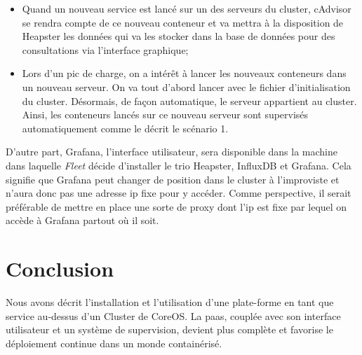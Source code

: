 \begin{onehalfspace}
\begin{itemize}
	\item Quand un nouveau service est lancé sur un des serveurs du cluster, cAdvisor se rendra compte de ce nouveau conteneur et va mettra à la disposition de Heapster les données qui va les stocker dans la base de données pour des consultations via l'interface graphique;
	\item Lors d'un pic de charge, on a intérêt à lancer les nouveaux conteneurs dans un nouveau serveur. On va tout d'abord lancer avec le fichier d'initialisation du cluster. Désormais, de façon automatique, le serveur appartient au cluster. Ainsi, les conteneurs lancés sur ce nouveau serveur sont supervisés automatiquement comme le décrit le scénario 1.
\end{itemize}

D'autre part, Grafana, l'interface utilisateur, sera disponible dans la machine dans laquelle \emph{Fleet} décide d'installer le trio Heapster, InfluxDB et Grafana. Cela signifie que Grafana peut changer de position dans le cluster à l'improviste et n'aura donc pas une adresse \acrshort{ip} fixe pour y accéder. Comme perspective, il serait préférable de mettre en place une sorte de proxy dont l'\acrshort{ip} est fixe par lequel on accède à Grafana partout où il soit.


\section*{Conclusion}

Nous avons décrit l'installation et l'utilisation d'une plate-forme en tant que service au-dessus d'un Cluster de CoreOS. La \acrshort{paas}, couplée avec son interface utilisateur et un système de supervision, devient plus complète et favorise le déploiement continue dans un monde containérisé.

\end{onehalfspace}
